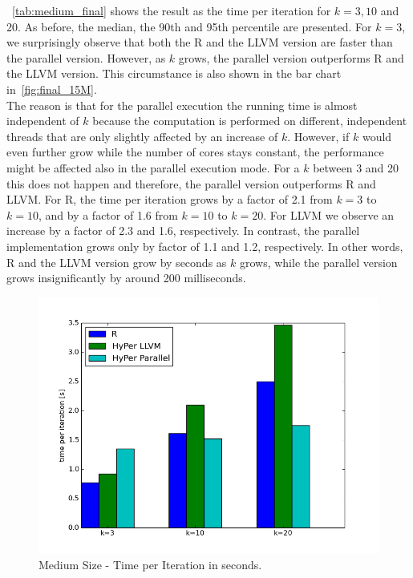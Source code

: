 ~\autoref{tab:medium_final} shows the result as the time per iteration for $k = 3, 10$ and 20. As before, the median, the 90th and 95th percentile are presented. For $k = 3$, we surprisingly observe that both the R and the LLVM version are faster than the parallel version. However, as $k$ grows, the parallel version outperforms R and the LLVM version. This circumstance is also shown in the bar chart in~\autoref{fig:final_15M}.
\\
The reason is that for the parallel execution the running time is almost independent of $k$ because the computation is performed on different, independent threads that are only slightly affected by an increase of $k$. However, if $k$ would even further grow while the number of cores stays constant, the performance might be affected also in the parallel execution mode. For a $k$ between 3 and 20 this does not happen and therefore, the parallel version outperforms R and LLVM. For R, the time per iteration grows by a factor of 2.1 from $k = 3$ to $k = 10$, and by a factor of 1.6 from $k = 10$ to $k = 20$. For LLVM we observe an increase by a factor of 2.3 and 1.6, respectively. In contrast, the parallel implementation grows only by factor of 1.1 and 1.2, respectively. In other words, R and the LLVM version grow by seconds as $k$ grows, while the parallel version grows insignificantly by around 200 milliseconds. 

\begin{figure}[htsb]
  \centering
  \includegraphics[scale=0.5, trim="0cm 1.5cm 0cm 0cm"]{figures/charts/final_15M}
  \caption[Medium Size - Time per Iteration]{Medium Size - Time per Iteration in seconds.}
  \label{fig:final_15M}
\end{figure}

